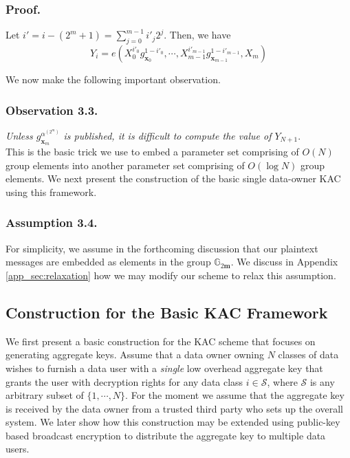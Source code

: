 \subsubsection{Proof.} Let $i'=i-(2^m+1)=\sum_{j=0}^{m-1}i'_j2^j$. Then, we have  
\begin{equation}
 Y_i=e(X^{i'_0}_0g^{1-i'_0}_{\mathbf{x}_0},\cdots,X^{i'_{m-1}}_{m-1}g^{1-i'_{m-1}}_{\mathbf{x}_{m-1}},X_m)\nonumber
\end{equation}

\noindent We now make the following important observation.
\subsubsection{Observation 3.3.} \emph{Unless $g^{\alpha^{(2^m)}}_{\mathbf{x}_m}$ is published, it is difficult to compute the value of $Y_{N+1}$}.\\

\noindent This is the basic trick we use to embed a parameter set comprising of $O(N)$ group elements into another parameter set comprising of $O(\log N)$ group elements. We next present the construction of the basic single data-owner KAC using this framework.

\subsubsection{Assumption 3.4.} For simplicity, we assume in the forthcoming discussion that our plaintext messages are embedded as elements in the group $\mathbb{G}_{2\mathbf{m}}$. We discuss in Appendix \ref{app_sec:relaxation} how we may modify our scheme to relax this assumption.

\subsection{Construction for the Basic KAC Framework}
\label{subsec:construction}

We first present a basic construction for the KAC scheme that focuses on generating aggregate keys. Assume that a data owner owning $N$ classes of data wishes to furnish a data user with a \emph{single} low overhead aggregate key that grants the user with decryption rights for any data class $i\in\mathcal{S}$, where $\mathcal{S}$ is any arbitrary subset of $\{1,\cdots,N\}$. For the moment we assume that the aggregate key is received by the data owner from a trusted third party who sets up the overall system. We later show how this construction may be extended using public-key based broadcast encryption to distribute the aggregate key to multiple data users.   

